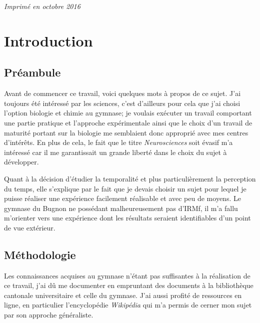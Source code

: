 \documentclass[12pt,fleqn,oneside,openany]{book} %
\begin{document}
\noindent \textit{Imprimé en octobre 2016} 



\pagestyle{empty} %

\tableofcontents %


\pagestyle{fancy} %



\chapter{Introduction} \label{cha:introduction}
\section{Préambule}
Avant de commencer ce travail, voici quelques mots à propos de ce sujet. J'ai toujours été intéressé par les sciences, c'est d'ailleurs pour cela que j'ai choisi l'option biologie et chimie au gymnase; je voulais exécuter un travail comportant une partie pratique et l'approche expérimentale ainsi que le choix d'un travail de maturité portant sur la biologie me semblaient donc approprié avec mes centres d'intérêts. En plus de cela, le fait que le titre \textit{Neurosciences} soit évasif m'a intéressé car il me garantissait un grande liberté dans le choix du sujet à développer.

Quant à la décision d'étudier la temporalité et plus particulièrement la perception du temps, elle s'explique par le fait que je devais choisir un sujet pour lequel je puisse réaliser une expérience facilement réalisable et avec peu de moyens. Le gymnase du Bugnon ne possédant malheureusement pas d'IRMf, il m'a fallu m'orienter vers une expérience dont les résultats seraient identifiables d'un point de vue extérieur. 

\section{Méthodologie} \label{sec:methodologie}
Les connaissances acquises au gymnase n'étant pas suffisantes à la réalisation de ce travail, j'ai dû me documenter en empruntant des documents à la bibliothèque cantonale universitaire et celle du gymnase. J'ai aussi profité de ressources en ligne, en particulier l'encyclopédie \textit{Wikipédia} qui m'a permis de cerner mon sujet par son approche généraliste.
\end{document}
